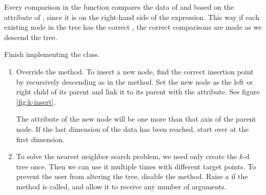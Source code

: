 Every comparison in the  function compares the data of  and  based on the  attribute of , since it is on the right-hand side of the expression.
This way if each existing node in the tree has the correct , the correct comparisons are made as we descend the tree.

\begin{problem}
Finish implementing the  class.
\begin{enumerate}
\item Override the  method.
To insert a new node, find the correct insertion point by recursively descending as in the  method.
Set the new node as the left or right child of its parent and link it to its parent with the  attribute.
See figure \ref{fig:k-insert}.

The  attribute of the new node will be one more than that axis of the parent node.
If the last dimension of the data has been reached, start over at the first dimension.

\item To solve the nearest neighbor search problem, we need only create the $k$-d tree once.
Then we can use it multiple times with different target points.
To prevent the user from altering the tree, disable the  method.
Raise a  if the method is called, and allow it to receive any number of arguments.
\end{enumerate}
\end{problem}

